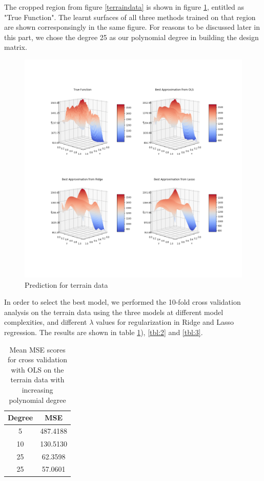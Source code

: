 \documentclass{article}
\begin{document}
The cropped region from figure \ref{terraindata} is shown in figure \ref{fig:realDataPlot}, entitled as "True Function". The learnt surfaces of all three methods trained on that region are shown corresponsingly in the same figure. For reasons to be discussed later in this part, we chose the degree 25 as our polynomial degree in building the design matrix.
\begin{figure}[h!]\centering
\includegraphics[scale=0.4]{Plots/PlotsRealData.png}
\caption{Prediction for terrain data}
\label{fig:realDataPlot}
\end{figure}
In order to select the best model, we performed the 10-fold cross validation analysis on the terrain data using the three models at different model complexities, and different $\lambda$ values for regularization in Ridge and Lasso regression. The results are shown in table \ref{table:1}), \ref{tbl:2} and \ref{tbl:3}. 

\begin{table}[h!]
\centering
\begin{tabular}{||c c||} 
 \hline
 Degree & MSE \\ 
 \hline
 5 & 487.4188  \\ 
 10 & 130.5130  \\
 25 & 62.3598  \\
 25 & 57.0601  \\  
 \hline
\end{tabular}
\caption{Mean MSE scores for cross validation with OLS on the terrain data with increasing polynomial degree}
\label{table:1}
\end{table}
\end{document}
